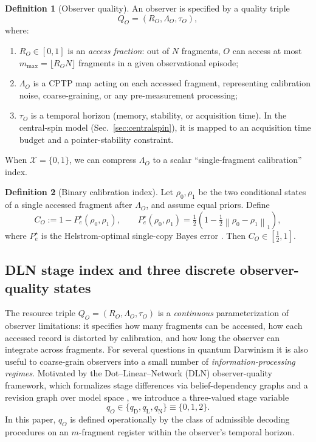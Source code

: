 \documentclass[11pt]{article}
\newcommand{\cX}{\mathcal{X}}
\newcommand{\normone}[1]{\left\lVert #1\right\rVert_{1}}
\newcommand{\1}{\mathbf{1}}
\theoremstyle{definition}
\newtheorem{definition}{Definition}
\theoremstyle{plain}
\begin{document}
\begin{definition}[Observer quality]
An observer is specified by a quality triple
\[
Q_O=(R_O,\Lambda_O,\tau_O),
\]
where:
\begin{enumerate}[leftmargin=2em]
\item $R_O\in[0,1]$ is an \emph{access fraction}: out of $N$ fragments, $O$ can access at most $m_{\max}=\lfloor R_O N\rfloor$ fragments in a given observational episode;
\item $\Lambda_O$ is a CPTP map acting on each accessed fragment, representing calibration noise, coarse-graining, or any pre-measurement processing;
\item $\tau_O$ is a temporal horizon (memory, stability, or acquisition time). In the central-spin model (Sec.~\ref{sec:centralspin}), it is mapped to an acquisition time budget and a pointer-stability constraint.
\end{enumerate}
\end{definition}

When $\cX=\{0,1\}$, we can compress $\Lambda_O$ to a scalar ``single-fragment calibration'' index.

\begin{definition}[Binary calibration index]
Let $\rho_0,\rho_1$ be the two conditional states of a single accessed fragment after $\Lambda_O$, and assume equal priors.
Define
\begin{equation}
C_O:=1-P_e^\star(\rho_0,\rho_1),
\qquad
P_e^\star(\rho_0,\rho_1)=\tfrac12\left(1-\tfrac12\normone{\rho_0-\rho_1}\right),
\label{eq:calibration}
\end{equation}
where $P_e^\star$ is the Helstrom-optimal single-copy Bayes error \citep{Helstrom1976,Watrous2018}.
Then $C_O\in[\tfrac12,1]$.
\end{definition}


\subsection{DLN stage index and three discrete observer-quality states}
\label{sec:qstates}

The resource triple $Q_O=(R_O,\Lambda_O,\tau_O)$ is a \emph{continuous} parameterization of observer limitations: it specifies how many fragments can be accessed, how each accessed record is distorted by calibration, and how long the observer can integrate across fragments.
For several questions in quantum Darwinism it is also useful to coarse-grain observers into a small number of \emph{information-processing regimes}.
Motivated by the Dot--Linear--Network (DLN) observer-quality framework, which formalizes stage differences via belief-dependency graphs and a revision graph over model space \citep{WuDLNCompression2026preprint}, we introduce a three-valued stage variable
\[
q_O \in \{q_{\mathrm{D}},q_{\mathrm{L}},q_{\mathrm{N}}\} \equiv \{0,1,2\}.
\]
In this paper, $q_O$ is defined operationally by the class of admissible decoding procedures on an $m$-fragment register within the observer's temporal horizon.
\end{document}
